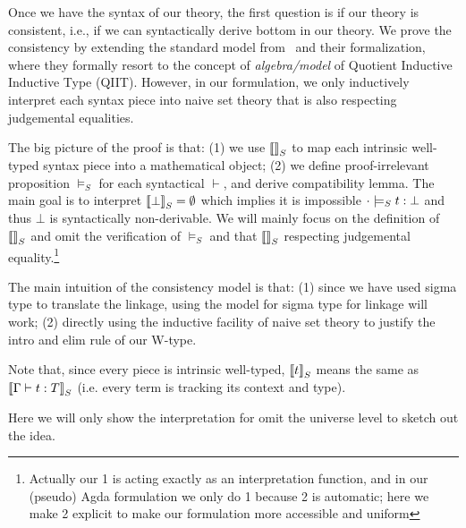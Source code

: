 

Once we have the syntax of our theory, the first question is if our theory is consistent, i.e., if we can syntactically derive bottom in our theory. We prove the consistency by extending the standard model from~\cite{altkap2016,kaposi2017type, kaposi2019gluing} and their formalization, where they formally resort to the concept of \textit{algebra/model} of Quotient Inductive Inductive Type (QIIT). However, in our formulation, we only inductively interpret each syntax piece into naive set theory that is also respecting judgemental equalities. 

The big picture of the proof is that: (1) we use ${\llbracket {} \rrbracket}_S$ to map each intrinsic well-typed syntax piece into a mathematical object; (2) we define proof-irrelevant proposition $\models_S$ for each syntactical $\vdash$, and derive compatibility lemma. The main goal is to interpret ${\llbracket {\bot} \rrbracket}_S = \emptyset$ which implies it is impossible ${ {\cdot} \models_S {t} : {\bot} }$ and thus $\bot$ is syntactically non-derivable. We will mainly focus on the definition of ${\llbracket {} \rrbracket}_S$ and omit the verification of $\models_S$ and that ${\llbracket {} \rrbracket}_S$ respecting judgemental equality.\footnote{Actually our 1 is acting exactly as an interpretation function, and in our (pseudo) Agda formulation we only do 1 because 2 is automatic; here we make 2 explicit to make our formulation more accessible and uniform}


The main intuition of the consistency model is that: (1) since we have used sigma type to translate the linkage, using the model for sigma type for linkage will work; (2) directly using the inductive facility of naive set theory to justify the intro and elim rule of our W-type.

Note that, since every piece is intrinsic well-typed, ${\llbracket {t} \rrbracket}_S$ means the same as ${\llbracket {\ensuremath{ {\Gamma} \vdash {t} : {T} }} \rrbracket}_S$ (i.e. every term is tracking its context and type).

Here we will only show the interpretation for  omit the universe level to sketch out the idea. 




